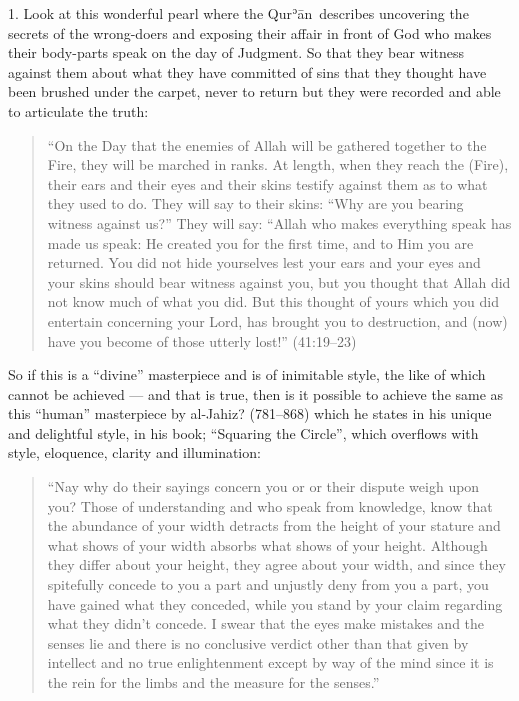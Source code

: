 \documentclass[12pt]{memoir}
\def\´{ʾ} %
\def \Quran{Qur\-\´ān} %
\newcommand{\QRef}[1]{{\color{darkblue}#1}}
\begin{document}
1. Look at this wonderful pearl where the \Quran\ describes uncovering
the secrets of the wrong-doers and exposing their affair in front of God
who makes their body-parts speak on the day of Judgment.
So that they bear witness against them about what they have committed of sins
that they thought have been brushed under the carpet,
never to return but they were recorded and able to articulate the truth:

\begin{quote}
“On the Day that the enemies of Allah will be gathered together to the Fire,
they will be marched in ranks.
At length, when they reach the (Fire),
their ears and their eyes and their skins testify against them
as to what they used to do.
They will say to their skins: “Why are you bearing witness against us?”
They will say: “Allah who makes everything speak has made us speak:
He created you for the first time, and to Him you are returned.
You did not hide yourselves lest your ears and your eyes and
your skins should bear witness against you,
but you thought that Allah did not know much of what you did.
But this thought of yours which you did entertain concerning your Lord,
has brought you to destruction,
and (now) have you become of those utterly lost!” (\QRef{41:19–23})
\end{quote}

So if this is a “divine” masterpiece and is of inimitable style,
the like of which cannot be achieved —
and that is true, then is it possible to achieve
the same as this “human” masterpiece by al-Jahiz? (781–868)
which he states in his unique and delightful style, in his book;
“Squaring the Circle”, which overflows with style,
eloquence, clarity and illumination:

\begin{quote}
“Nay why do their sayings concern you or or their dispute weigh upon you?
Those of understanding and who speak from knowledge,
know that the abundance of your width detracts from the height of your stature
and what shows of your width absorbs what shows of your height.
Although they differ about your height, they agree about your width,
and since they spitefully concede to you a part and
unjustly deny from you a part, you have gained what they conceded,
while you stand by your claim regarding what they didn’t concede.
I swear that the eyes make mistakes and the senses lie and
there is no conclusive verdict other than that given by intellect and
no true enlightenment except by way of the mind since it is the rein
for the limbs and the measure for the senses.”\footnotemark
\end{quote}
\end{document}
